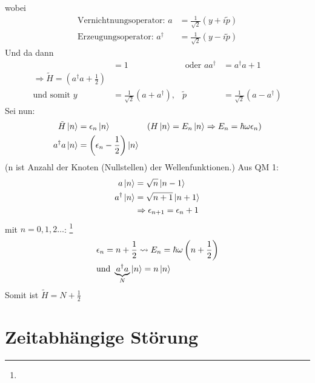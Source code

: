 	wobei 
		\begin{align*}
			\text{Vernichtnungsoperator:~} a &= \frac{1}{\sqrt{2}} 
			\left( y + i \tilde{p} \right) \\
			\text{Erzeugungsoperator:~} a^\dagger &= \frac{1}{\sqrt{2}} 
			\left( y - i \tilde{p} \right)
		\end{align*}
	Und da dann
		\begin{align*}
			[a , a^\dagger] &= 1 &\text{~oder~} a a^\dagger &= a^\dagger a + 1 \\
			\Rightarrow \tilde{H} = \left( a^\dagger a + \frac{1}{2} \right)& \\
			\text{und somit~} 
			y &= \frac{1}{\sqrt{2}} \left( a + a^\dagger \right),& 
			\tilde{p} &= \frac{1}{\sqrt{2}} \left( a - a^\dagger \right)
		\end{align*}
	Sei nun:
		\begin{align*}
			\tilde{H} \ket{n} &= \epsilon_n \ket{n} 
			&\left( H \ket{n} = E_n \ket{n} 
			\Rightarrow E_n = \hbar \omega \epsilon_n \right) \\
			a^\dagger a \ket{n} &= \left( \epsilon_n - \frac{1}{2} \right) \ket{n}
		\end{align*}
	(n ist Anzahl der Knoten (Nullstellen) der Wellenfunktionen.)
	Aus QM 1:
		\begin{align*}
			a \ket{n} &= \sqrt{n} \ket{n-1} \\
			a^\dagger \ket {n} &= \sqrt{n+1} \ket{n+1} \\
			&\Rightarrow \epsilon_{n+1} = \epsilon_n + 1
		\end{align*}
	mit $n = 0, 1, 2 \ldots$: \footnote{}
		\begin{align*}
			&\epsilon_n = n + \frac{1}{2} \leadsto E_n = \hbar \omega \left(n + \frac{1}{2} \right) \\
			&\text{und~} \underbrace{a^\dagger a}_{\substack{N}}
			\ket{n} = n \ket{n}
		\end{align*} %
	Somit ist $\tilde{H} = N + \frac{1}{2}$
	
\section{Zeitabhängige Störung}

